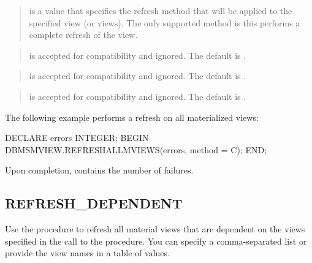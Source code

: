 \documentclass[letterpaper,10pt,english,openany,oneside]{sphinxmanual}
\begin{document}
\begin{quote}

 is a  value that specifies the refresh method that
will be applied to the specified view (or views). The only supported
method is  this performs a complete refresh of the view.
\end{quote}

\begin{quote}

 is accepted for compatibility and ignored. The
default is .
\end{quote}

\begin{quote}

 is accepted for compatibility and ignored.
The default is .
\end{quote}

\begin{quote}

 is accepted for compatibility and ignored. The
default is .
\end{quote}


The following example performs a  refresh on all materialized
views:

%
\begin{sphinxVerbatim}[commandchars=\\\{\}]
DECLARE
  errors INTEGER;
BEGIN
  DBMS\PYGZus{}MVIEW.REFRESH\PYGZus{}ALL\PYGZus{}MVIEWS(errors, method =\PYGZgt{} \PYGZsq{}C\PYGZsq{});
END;
\end{sphinxVerbatim}

Upon completion,  contains the number of failures.

\newpage


\subsection{REFRESH\_DEPENDENT}
\label{\detokenize{refresh_dependent::doc}}\label{\detokenize{refresh_dependent:refresh-dependent}}
Use the  procedure to refresh all material views that
are dependent on the views specified in the call to the procedure. You
can specify a comma-separated list or provide the view names in a table
of  values.
\end{document}
